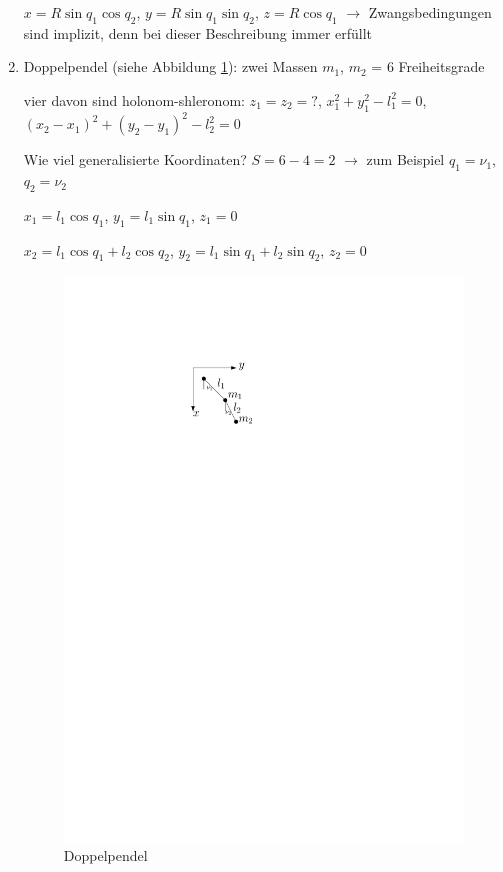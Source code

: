 \begin{enumerate}
	$x = R \sin q_1 \cos q_2$, $y = R \sin q_1 \sin q_2$, $z = R \cos q_1$ $\rightarrow$ Zwangsbedingungen sind implizit, denn bei dieser Beschreibung immer erfüllt
	
	\item Doppelpendel (siehe Abbildung \ref{fig:ch1_doppelpendel}): zwei Massen $m_1$, $m_2$ = $6$ Freiheitsgrade
	
	vier davon sind holonom-shleronom: $z_1 = z_2 = ?$, $x_1^2 + y_1^2 - l_1^2 = 0$, $(x_2 - x_1)^2 + (y_2 - y_1)^2 - l_2^2 = 0$
	
	Wie viel generalisierte Koordinaten? $S = 6 - 4 = 2$ $\rightarrow$ zum Beispiel $q_1 = \nu_1$, $q_2 = \nu_2$
	
	$x_1 = l_1 \cos q_1$, $y_1 = l_1 \sin q_1$, $z_1 = 0$
	
	$x_2 = l_1 \cos q_1 + l_2 \cos q_2$, $y_2 = l_1 \sin q_1 + l_2 \sin q_2$, $z_2 = 0$
	\begin{figure}
		\centering
		\includegraphics{figures/ch1/doppelpendel}
		\caption{Doppelpendel}
		\label{fig:ch1_doppelpendel}
	\end{figure}
\end{enumerate}

